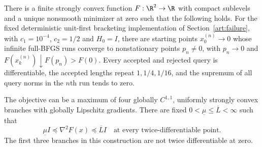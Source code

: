 \begin{theorem}
\label{art:local-failure-lower}
There is a finite strongly convex function $F:\R^2\to\R$ with compact
sublevels and a unique nonsmooth minimizer at zero such that the following
holds. For the fixed deterministic unit-first bracketing implementation of
Section~\ref{art:failure}, with $c_1=10^{-4}$, $c_2=1/2$ and $H_0=I$,
there are starting points $x_0^{(n)}\to0$ whose infinite full-BFGS runs
converge to nonstationary points $p_n\ne0$, with $p_n\to0$ and
$F(x_k^{(n)})\downarrow F(p_n)>F(0)$. Every accepted and rejected query
is differentiable, the accepted lengths repeat $1,1/4,1/16$, and the
supremum of all query norms in the $n$th run tends to zero.

The objective can be a maximum of four globally $C^{1,1}$, uniformly
strongly convex branches with globally Lipschitz gradients. There are
fixed $0<\underline\mu\le\overline L<\infty$ such that
\[
 \underline\mu I\preceq\nabla^2F(x)\preceq\overline L I
 \quad\text{at every twice-differentiable point}.
\]
The first three branches in this construction are not twice
differentiable at zero.
\end{theorem}
